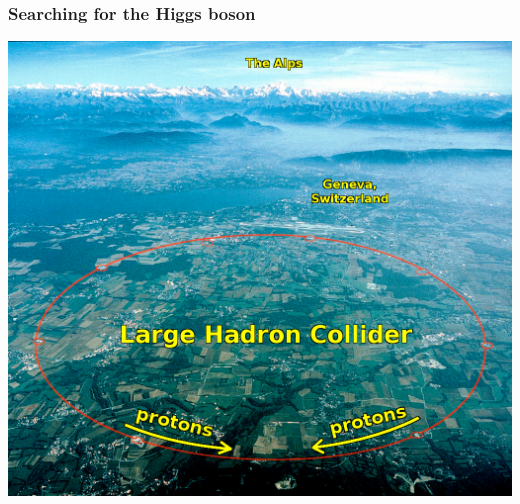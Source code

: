 \documentclass[compress]{beamer}
\begin{document}
\begin{frame}
\frametitle{Searching for the Higgs boson}
\begin{center}
\includegraphics[width=0.8\linewidth]{cernpanorama.jpg}
\end{center}
\end{frame}
\end{document}
